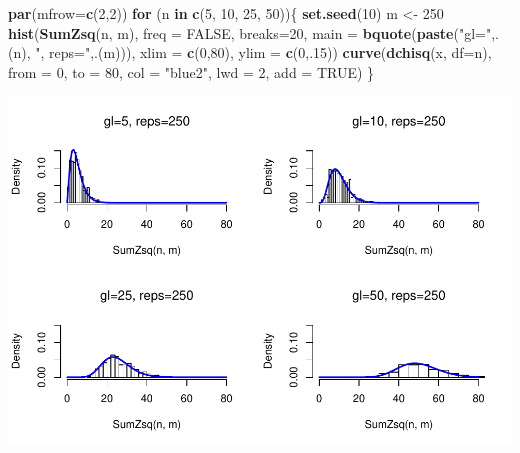 \documentclass[]{article}
\newenvironment{Shaded}{\begin{snugshade}}{\end{snugshade}}
\newcommand{\ControlFlowTok}[1]{\textcolor[rgb]{0.13,0.29,0.53}{\textbf{#1}}}
\newcommand{\DataTypeTok}[1]{\textcolor[rgb]{0.13,0.29,0.53}{#1}}
\newcommand{\DecValTok}[1]{\textcolor[rgb]{0.00,0.00,0.81}{#1}}
\newcommand{\KeywordTok}[1]{\textcolor[rgb]{0.13,0.29,0.53}{\textbf{#1}}}
\newcommand{\NormalTok}[1]{#1}
\newcommand{\OtherTok}[1]{\textcolor[rgb]{0.56,0.35,0.01}{#1}}
\newcommand{\StringTok}[1]{\textcolor[rgb]{0.31,0.60,0.02}{#1}}
\begin{document}
\begin{Shaded}
\begin{Highlighting}[]
\KeywordTok{par}\NormalTok{(}\DataTypeTok{mfrow=}\KeywordTok{c}\NormalTok{(}\DecValTok{2}\NormalTok{,}\DecValTok{2}\NormalTok{))}
\ControlFlowTok{for}\NormalTok{ (n }\ControlFlowTok{in} \KeywordTok{c}\NormalTok{(}\DecValTok{5}\NormalTok{, }\DecValTok{10}\NormalTok{, }\DecValTok{25}\NormalTok{, }\DecValTok{50}\NormalTok{))\{}
  \KeywordTok{set.seed}\NormalTok{(}\DecValTok{10}\NormalTok{)}
\NormalTok{  m <-}\StringTok{ }\DecValTok{250}
  \KeywordTok{hist}\NormalTok{(}\KeywordTok{SumZsq}\NormalTok{(n, m), }\DataTypeTok{freq =} \OtherTok{FALSE}\NormalTok{, }\DataTypeTok{breaks=}\DecValTok{20}\NormalTok{,}
       \DataTypeTok{main =} \KeywordTok{bquote}\NormalTok{(}\KeywordTok{paste}\NormalTok{(}\StringTok{"gl="}\NormalTok{,.(n), }\StringTok{", reps="}\NormalTok{,.(m))),}
       \DataTypeTok{xlim =} \KeywordTok{c}\NormalTok{(}\DecValTok{0}\NormalTok{,}\DecValTok{80}\NormalTok{), }\DataTypeTok{ylim =} \KeywordTok{c}\NormalTok{(}\DecValTok{0}\NormalTok{,.}\DecValTok{15}\NormalTok{))}
  \KeywordTok{curve}\NormalTok{(}\KeywordTok{dchisq}\NormalTok{(x, }\DataTypeTok{df=}\NormalTok{n),}
        \DataTypeTok{from =} \DecValTok{0}\NormalTok{, }\DataTypeTok{to =} \DecValTok{80}\NormalTok{,}
        \DataTypeTok{col  =} \StringTok{"blue2"}\NormalTok{,}
        \DataTypeTok{lwd  =} \DecValTok{2}\NormalTok{,}
        \DataTypeTok{add  =} \OtherTok{TRUE}\NormalTok{) }
\NormalTok{\}}
\end{Highlighting}
\end{Shaded}

\includegraphics{NotaDeClaseLong_files/figure-latex/unnamed-chunk-13-1.pdf}
\end{document}
